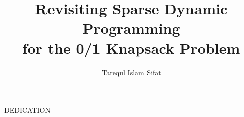 \documentclass[master]{thesis}
\title{Revisiting Sparse Dynamic Programming\\ for the 0/1 Knapsack Problem}
\author{Tarequl Islam Sifat}
\begin{document}

\frontmatter %

\maketitle              %
\makemycopyright        %
\makeabstract           %
\makeacknowledgements   %

\begin{flatcenter} %

    DEDICATION

    \vfill %

    \vfill %
\end{flatcenter}
\newpage

\tableofcontents    %
\listoftables       %
\listoffigures      %

\mainmatter %






%






\backmatter %




\appendix %
\end{document}
